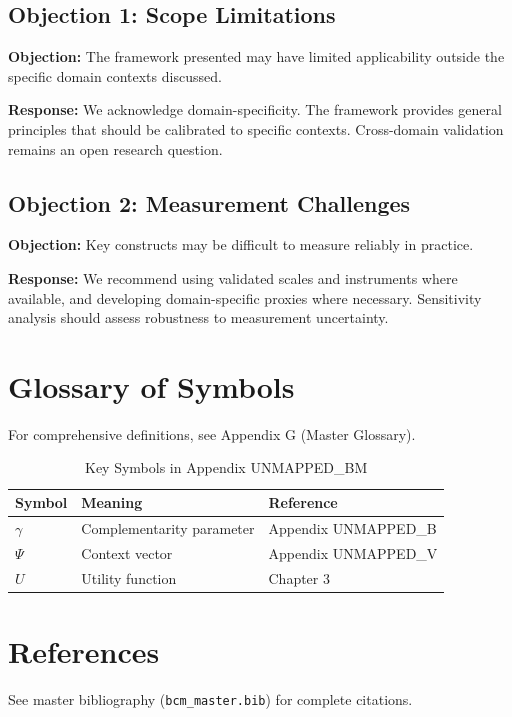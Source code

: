 \subsection{Objection 1: Scope Limitations}

\textbf{Objection:} The framework presented may have limited applicability
outside the specific domain contexts discussed.

\textbf{Response:} We acknowledge domain-specificity. The framework provides
general principles that should be calibrated to specific contexts. Cross-domain
validation remains an open research question.

\subsection{Objection 2: Measurement Challenges}

\textbf{Objection:} Key constructs may be difficult to measure reliably in
practice.

\textbf{Response:} We recommend using validated scales and instruments where
available, and developing domain-specific proxies where necessary. Sensitivity
analysis should assess robustness to measurement uncertainty.



\section{Glossary of Symbols}
\label{sec:bm-glossary}

For comprehensive definitions, see Appendix G (Master Glossary).

\begin{table}[htbp]
\centering
\caption{Key Symbols in Appendix UNMAPPED_BM}
\begin{tabular}{lll}
\toprule
\textbf{Symbol} & \textbf{Meaning} & \textbf{Reference} \\
\midrule
$\gamma$ & Complementarity parameter & Appendix UNMAPPED_B \\
$\Psi$ & Context vector & Appendix UNMAPPED_V \\
$U$ & Utility function & Chapter 3 \\
\bottomrule
\end{tabular}
\end{table}


\section{References}
\label{sec:references}

See master bibliography (\texttt{bcm\_master.bib}) for complete citations.

\nocite{bcm_master}

